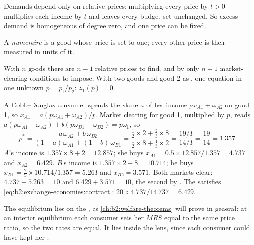 Demands depend only on relative prices: multiplying every price by $t > 0$ multiplies each income by $t$
and leaves every budget set unchanged. So excess demand is homogeneous of degree zero, and one price can
be fixed.

\begin{definition}[Numeraire]\label{def:b2:exchange-economies:numeraire}
A \emph{numeraire} is a good whose price is set to one; every other price is then
measured in units of it.
\end{definition}

With $n$ goods there are $n - 1$ relative prices to find, and by  only $n - 1$ market-clearing
conditions to impose. With two goods and good 2 as , one equation in one unknown $p = p_1/p_2$:
$z_1(p) = 0$.

\begin{example}\label{ex:b2:exchange-economies:running}
A Cobb--Douglas consumer spends the share $a$ of her income $p\omega_{A1} + \omega_{A2}$ on good 1, so
$x_{A1} = a(p\omega_{A1} + \omega_{A2})/p$. Market clearing for good 1, multiplied by $p$, reads
$a(p\omega_{A1} + \omega_{A2}) + b(p\omega_{B1} + \omega_{B2}) = p\bar\omega_1$, so
\[
p^* = \frac{a\,\omega_{A2} + b\,\omega_{B2}}{(1 - a)\,\omega_{A1} + (1 - b)\,\omega_{B1}}
= \frac{\tfrac12 \times 2 + \tfrac23 \times 8}{\tfrac12 \times 8 + \tfrac13 \times 2} =
\frac{19/3}{14/3} = \frac{19}{14} = 1.357 .
\]
$A$'s income is $1.357 \times 8 + 2 = 12.857$; she buys $x_{A1} = 0.5 \times 12.857/1.357 = 4.737$ and
$x_{A2} = 6.429$. $B$'s income is $1.357 \times 2 + 8 = 10.714$; he buys $x_{B1} = \tfrac23 \times
10.714/1.357 = 5.263$ and $x_{B2} = 3.571$. Both markets clear: $4.737 + 5.263 = 10$ and $6.429 + 3.571 =
10$, the second by . The  satisfies \eqref{eq:b2:exchange-economies:contract}:
$20 \times 4.737/14.737 = 6.429$.
\end{example}

The equilibrium lies on the , as \cref{ch:b2:welfare-theorems} will prove in general: at
an interior equilibrium each consumer sets her $\mathit{MRS}$ equal to the same price ratio, so the two
rates are equal. It lies inside the lens, since each consumer could have kept her .

